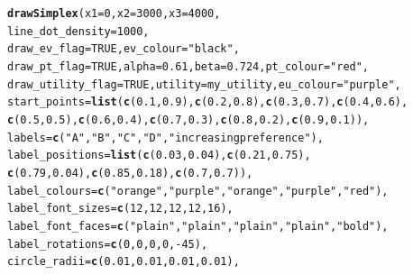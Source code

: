 \documentclass{article}\usepackage[]{graphicx}\usepackage[]{color}
\makeatletter
\newcommand{\hlnum}[1]{\textcolor[rgb]{0.686,0.059,0.569}{#1}}%
\newcommand{\hlstr}[1]{\textcolor[rgb]{0.192,0.494,0.8}{#1}}%
\newcommand{\hlopt}[1]{\textcolor[rgb]{0,0,0}{#1}}%
\newcommand{\hlstd}[1]{\textcolor[rgb]{0.345,0.345,0.345}{#1}}%
\newcommand{\hlkwc}[1]{\textcolor[rgb]{0.333,0.667,0.333}{#1}}%
\newcommand{\hlkwd}[1]{\textcolor[rgb]{0.737,0.353,0.396}{\textbf{#1}}}%
\newenvironment{kframe}{%
 \def\at@end@of@kframe{}%
 \ifinner\ifhmode%
  \def\at@end@of@kframe{\end{minipage}}%
  \begin{minipage}{\columnwidth}%
 \fi\fi%
 \def\FrameCommand##1{\hskip\@totalleftmargin \hskip-\fboxsep
 \colorbox{shadecolor}{##1}\hskip-\fboxsep
     \hskip-\linewidth \hskip-\@totalleftmargin \hskip\columnwidth}%
 \MakeFramed {\advance\hsize-\width
   \@totalleftmargin\z@ \linewidth\hsize
   \@setminipage}}%
 {\par\unskip\endMakeFramed%
 \at@end@of@kframe}
\newenvironment{knitrout}{}{} %
\makeatother
\begin{document}
\begin{knitrout}
\begin{kframe}
\begin{alltt}
\hlkwd{drawSimplex}\hlstd{(}\hlkwc{x1}\hlstd{=}\hlnum{0}\hlstd{,} \hlkwc{x2}\hlstd{=}\hlnum{3000}\hlstd{,} \hlkwc{x3}\hlstd{=}\hlnum{4000}\hlstd{,}
        \hlkwc{line_dot_density}\hlstd{=}\hlnum{1000}\hlstd{,}
        \hlkwc{draw_ev_flag}\hlstd{=}\hlnum{TRUE}\hlstd{,} \hlkwc{ev_colour}\hlstd{=}\hlstr{"black"}\hlstd{,}
        \hlkwc{draw_pt_flag}\hlstd{=}\hlnum{TRUE}\hlstd{,} \hlkwc{alpha}\hlstd{=}\hlnum{0.61}\hlstd{,} \hlkwc{beta}\hlstd{=}\hlnum{0.724}\hlstd{,} \hlkwc{pt_colour}\hlstd{=}\hlstr{"red"}\hlstd{,}
        \hlkwc{draw_utility_flag}\hlstd{=}\hlnum{TRUE}\hlstd{,} \hlkwc{utility}\hlstd{=my_utility,} \hlkwc{eu_colour}\hlstd{=}\hlstr{"purple"}\hlstd{,}
        \hlkwc{start_points}\hlstd{=}\hlkwd{list}\hlstd{(}\hlkwd{c}\hlstd{(}\hlnum{0.1}\hlstd{,}\hlnum{0.9}\hlstd{),}\hlkwd{c}\hlstd{(}\hlnum{0.2}\hlstd{,}\hlnum{0.8}\hlstd{),}\hlkwd{c}\hlstd{(}\hlnum{0.3}\hlstd{,}\hlnum{0.7}\hlstd{),}\hlkwd{c}\hlstd{(}\hlnum{0.4}\hlstd{,}\hlnum{0.6}\hlstd{),}
                \hlkwd{c}\hlstd{(}\hlnum{0.5}\hlstd{,}\hlnum{0.5}\hlstd{),}\hlkwd{c}\hlstd{(}\hlnum{0.6}\hlstd{,}\hlnum{0.4}\hlstd{),}\hlkwd{c}\hlstd{(}\hlnum{0.7}\hlstd{,}\hlnum{0.3}\hlstd{),}\hlkwd{c}\hlstd{(}\hlnum{0.8}\hlstd{,}\hlnum{0.2}\hlstd{),}\hlkwd{c}\hlstd{(}\hlnum{0.9}\hlstd{,}\hlnum{0.1}\hlstd{)),}
        \hlkwc{labels}\hlstd{=}\hlkwd{c}\hlstd{(}\hlstr{"A"}\hlstd{,}\hlstr{"B"}\hlstd{,}\hlstr{"C"}\hlstd{,}\hlstr{"D"}\hlstd{,}\hlstr{"increasing preference"}\hlstd{),}
        \hlkwc{label_positions}\hlstd{=}\hlkwd{list}\hlstd{(}\hlkwd{c}\hlstd{(}\hlnum{0.03}\hlstd{,}\hlnum{0.04}\hlstd{),}\hlkwd{c}\hlstd{(}\hlnum{0.21}\hlstd{,}\hlnum{0.75}\hlstd{),}
                \hlkwd{c}\hlstd{(}\hlnum{0.79}\hlstd{,}\hlnum{0.04}\hlstd{),}\hlkwd{c}\hlstd{(}\hlnum{0.85}\hlstd{,}\hlnum{0.18}\hlstd{),}\hlkwd{c}\hlstd{(}\hlnum{0.7}\hlstd{,}\hlnum{0.7}\hlstd{)),}
        \hlkwc{label_colours}\hlstd{=}\hlkwd{c}\hlstd{(}\hlstr{"orange"}\hlstd{,}\hlstr{"purple"}\hlstd{,}\hlstr{"orange"}\hlstd{,}\hlstr{"purple"}\hlstd{,}\hlstr{"red"}\hlstd{),}
        \hlkwc{label_font_sizes}\hlstd{=}\hlkwd{c}\hlstd{(}\hlnum{12}\hlstd{,}\hlnum{12}\hlstd{,}\hlnum{12}\hlstd{,}\hlnum{12}\hlstd{,}\hlnum{16}\hlstd{),}
        \hlkwc{label_font_faces}\hlstd{=}\hlkwd{c}\hlstd{(}\hlstr{"plain"}\hlstd{,}\hlstr{"plain"}\hlstd{,}\hlstr{"plain"}\hlstd{,}\hlstr{"plain"}\hlstd{,}\hlstr{"bold"}\hlstd{),}
        \hlkwc{label_rotations}\hlstd{=}\hlkwd{c}\hlstd{(}\hlnum{0}\hlstd{,}\hlnum{0}\hlstd{,}\hlnum{0}\hlstd{,}\hlnum{0}\hlstd{,}\hlopt{-}\hlnum{45}\hlstd{),}
        \hlkwc{circle_radii}\hlstd{=}\hlkwd{c}\hlstd{(}\hlnum{0.01}\hlstd{,}\hlnum{0.01}\hlstd{,}\hlnum{0.01}\hlstd{,}\hlnum{0.01}\hlstd{),}

\end{alltt}
\end{kframe}
\end{knitrout}
\end{document}
